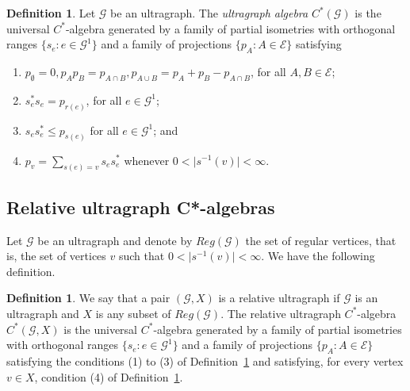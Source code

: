 \documentclass[12pt, reqno]{amsart}
\newtheorem{proposition}[theorem]{Proposition}
\theoremstyle{definition}
\newtheorem{definition}[theorem]{Definition}
\theoremstyle{remark}
\numberwithin{equation}{section}
\newcommand{\C}{$C^\ast$}
\newcommand{\G}{\mathcal{G}}
\newcommand {\N}{\mathbb{N}}
\begin{document}
\begin{definition}\label{def of C^*(mathcal{G})}
Let $\mathcal{G}$ be an ultragraph. The \emph{ultragraph algebra} $C^*(\mathcal{G})$ is the universal $C^*$-algebra generated by a family of partial isometries with orthogonal ranges $\{s_e:e\in \mathcal{G}^1\}$ and a family of projections $\{p_A:A\in \mathcal{E}\}$ satisfying
\begin{enumerate}
\item\label{p_Ap_B=p_{A cap B}}  $p_\emptyset=0,  p_Ap_B=p_{A\cap B},  p_{A\cup B}=p_A+p_B-p_{A\cap B}$, for all $A,B\in \mathcal{E}$;
\item\label{s_e^*s_e=p_{r(e)}}$s_e^*s_e=p_{r(e)}$, for all $e\in \mathcal{G}^1$;
\item $s_es_e^*\leq p_{s(e)}$ for all $e\in \mathcal{G}^1$; and
\item\label{CK-condition} $p_v=\sum\limits_{s(e)=v}s_es_e^*$ whenever $0<\vert s^{-1}(v)\vert< \infty$.
\end{enumerate}
\end{definition}



\subsection{Relative ultragraph C*-algebras}

Let $\G$ be an ultragraph and denote by $Reg(\G)$ the set of regular vertices, that is, the set of vertices $v$ such that $0<\vert s^{-1}(v)\vert< \infty$. We have the following definition.

\begin{definition}\label{relative}
We say that  a pair $(\mathcal{G},X)$ is a relative ultragraph if $\G$ is an ultragraph and $X$ is any subset of $Reg(\G)$. The relative ultragraph \C-algebra $C^*(\G,X)$ is the universal 
$C^*$-algebra generated by a family of partial isometries with orthogonal ranges $\{s_e:e\in \mathcal{G}^1\}$ and a family of projections $\{p_A:A\in \mathcal{E}\}$ satisfying the conditions (1) to (3) of Definition~\ref{def of C^*(mathcal{G})} and satisfying, for every vertex $v\in X$, condition (4) of Definition~\ref{def of C^*(mathcal{G})}.
\end{definition}
\end{document}
